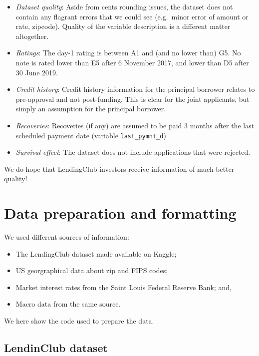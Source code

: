 \documentclass[11pt,]{report}
\begin{document}
\begin{itemize}
\item
  \emph{Dataset quality}: Aside from cents rounding issues, the dataset does not contain any flagrant errors that we could see (e.g.~minor error of amount or rate, zipcode). Quality of the variable description is a different matter altogether.
\item
  \emph{Ratings}: The day-1 rating is between A1 and (and no lower than) G5. No note is rated lower than E5 after 6 November 2017, and lower than D5 after 30 June 2019.
\item
  \emph{Credit history}: Credit history information for the principal borrower relates to pre-approval and not post-funding. This is clear for the joint applicants, but simply an assumption for the principal borrower.
\item
  \emph{Recoveries}: Recoveries (if any) are assumed to be paid 3 months after the last scheduled payment date (variable \texttt{last\_pymnt\_d})
\item
  \emph{Survival effect}: The dataset does not include applications that were rejected.
\end{itemize}

We do hope that LendingClub investors receive information of much better quality!

\hypertarget{data-preparation-and-formatting}{%
\section{Data preparation and formatting}\label{data-preparation-and-formatting}}

We used different sources of information:

\begin{itemize}
\item
  The LendingClub dataset made available on Kaggle;
\item
  US georgraphical data about zip and FIPS codes;
\item
  Market interest rates from the Saint Louis Federal Reserve Bank; and,
\item
  Macro data from the same source.
\end{itemize}

We here show the code used to prepare the data.

\hypertarget{lendinclub-dataset}{%
\subsection{LendinClub dataset}\label{lendinclub-dataset}}
\end{document}
